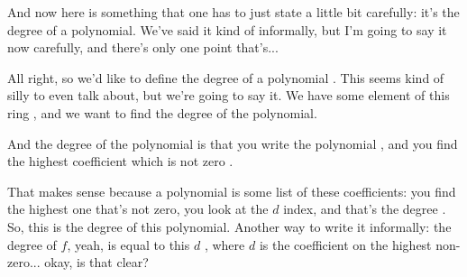 \begin{speech}[00:23:20 - 00:24:30]
And now here is something that one has to just state a little bit carefully: it's the degree of a polynomial. We've said it kind of informally, but I'm going to say it now carefully, and there's only one point that's...

All right, so we'd like to define the degree of a polynomial . This seems kind of silly to even talk about, but we're going to say it. We have some element of this ring , and we want to find the degree of the polynomial.

And the degree of the polynomial is that you write the polynomial , and you find the highest coefficient which is not zero .

That makes sense because a polynomial is some list of these coefficients: you find the highest one that's not zero, you look at the $d$ index, and that's the degree . So, this is the degree of this polynomial. Another way to write it informally: the degree of $f$, yeah, is equal to this $d$ , where $d$ is the coefficient on the highest non-zero... okay, is that clear?
\end{speech}

\begin{content}
\end{content}

\begin{hidden}
\end{hidden}


